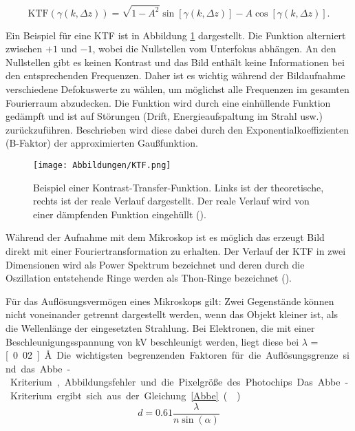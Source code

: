 \begin{equation}
	\text{KTF}(\gamma(k,\Delta z)) = \sqrt{1-A^2} \sin[\gamma(k,\Delta z)] - A \cos[\gamma(k,\Delta z)]. \label{KTF}
\end{equation}

Ein Beispiel für eine KTF ist in Abbildung \ref{KTF_pic} dargestellt.
Die Funktion alterniert zwischen $+1$ und $-1$, wobei die Nullstellen vom Unterfokus abhängen.
An den Nullstellen gibt es keinen Kontrast und das Bild enthält keine Informationen bei den entsprechenden Frequenzen.
Daher ist es wichtig während der Bildaufnahme verschiedene Defokuswerte zu wählen, um möglichst alle Frequenzen im gesamten Fourierraum abzudecken.
Die Funktion wird durch eine einhüllende Funktion gedämpft und ist auf Störungen (Drift, Energieaufspaltung im Strahl usw.) zurückzuführen.
Beschrieben wird diese dabei durch den Exponentialkoeffizienten (B-Faktor) der approximierten Gaußfunktion.

\begin{figure}[h!]
\texttt{[image: Abbildungen/KTF.png]}
\caption[Beispiel einer Kontrast-Transfer-Funktion]{Beispiel einer Kontrast-Transfer-Funktion. Links ist der theoretische, rechts ist der reale Verlauf dargestellt. Der reale Verlauf wird von einer  dämpfenden Funktion eingehüllt (\cite{behrmann}).}
\label{KTF_pic}
\end{figure}

Während der Aufnahme mit dem Mikroskop ist es möglich das erzeugt Bild direkt mit einer Fouriertransformation zu erhalten.
Der Verlauf der KTF in zwei Dimensionen wird als Power Spektrum bezeichnet und deren durch die Oszillation entstehende Ringe werden als Thon-Ringe bezeichnet (\cite{thon}).

Für das Auflösungsvermögen eines Mikroskops gilt: Zwei Gegenstände können nicht voneinander getrennt dargestellt werden, wenn das Objekt kleiner ist, als die Wellenlänge der eingesetzten Strahlung.
Bei Elektronen, die mit einer Beschleunigungsspannung von \unit[300]{kV} beschleunigt werden, liegt diese bei $\lambda$ = \unit[0.02]{\AA}.
Die wichtigsten begrenzenden Faktoren für die Auflösungsgrenze sind das Abbe-Kriterium, Abbildungsfehler und die Pixelgröße des Photochips.
Das Abbe-Kriterium ergibt sich aus der Gleichung \eqref{Abbe} (\cite{alex}).

\begin{equation}
	d = 0.61 \frac{\lambda}{n \sin(\alpha)} \label{Abbe}
\end{equation}

